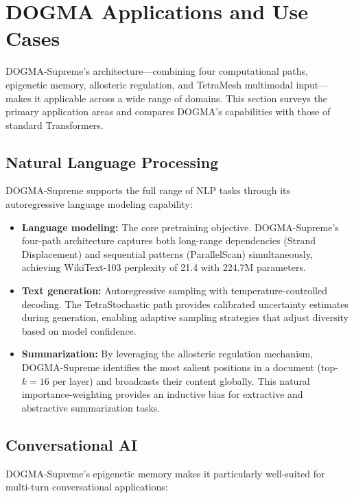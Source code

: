 \section{DOGMA Applications and Use Cases}
\label{sec:applications}

DOGMA-Supreme's architecture---combining four computational paths, epigenetic memory, allosteric regulation, and TetraMesh multimodal input---makes it applicable across a wide range of domains. This section surveys the primary application areas and compares DOGMA's capabilities with those of standard Transformers.

\subsection{Natural Language Processing}
\label{sec:app-nlp}

DOGMA-Supreme supports the full range of NLP tasks through its autoregressive language modeling capability:

\begin{itemize}[leftmargin=1.8em]
  \item \textbf{Language modeling:} The core pretraining objective. DOGMA-Supreme's four-path architecture captures both long-range dependencies (Strand Displacement) and sequential patterns (ParallelScan) simultaneously, achieving WikiText-103 perplexity of 21.4 with 224.7M parameters.
  \item \textbf{Text generation:} Autoregressive sampling with temperature-controlled decoding. The TetraStochastic path provides calibrated uncertainty estimates during generation, enabling adaptive sampling strategies that adjust diversity based on model confidence.
  \item \textbf{Summarization:} By leveraging the allosteric regulation mechanism, DOGMA-Supreme identifies the most salient positions in a document (top-$k = 16$ per layer) and broadcasts their content globally. This natural importance-weighting provides an inductive bias for extractive and abstractive summarization tasks.
\end{itemize}

\subsection{Conversational AI}
\label{sec:app-conversational}

DOGMA-Supreme's epigenetic memory makes it particularly well-suited for multi-turn conversational applications:

